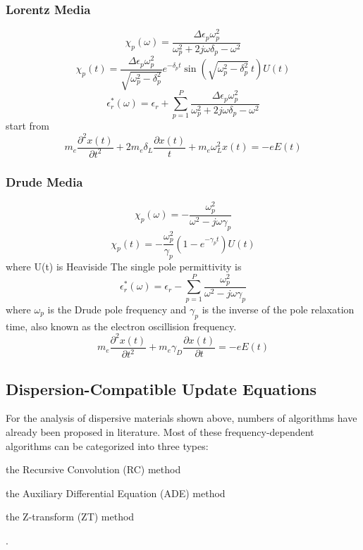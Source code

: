 \subsubsection{Lorentz Media}
\begin{equation}
  \chi_p(\omega) = \frac{\Delta\epsilon_p\omega_p^2}{\omega_p^2 + 2j\omega\delta_p - \omega^2}  
\end{equation}
\begin{equation}
  \chi_p(t) = \frac{\Delta \epsilon_p \omega_p^2}{\sqrt{\omega_p^2 - \delta_p^2}}e^{-\delta_p t}\sin\left(\sqrt{\omega_p^2-\delta_p^2}\ t\right)U(t)
\end{equation}
\begin{equation}
  \epsilon_r^*(\omega) = \epsilon_r + \sum_{p=1}^P \frac{\Delta\epsilon_p\omega_p^2}{\omega_p^2 + 2j\omega\delta_p - \omega^2}  
\end{equation}
start from
\begin{equation}
    m_e\frac{\partial^2 x(t)}{\partial t^2} + 2m_e\delta_L\frac{\partial x(t)}{t} + m_e\omega_L^2x(t) = -eE(t)
\end{equation}



\subsubsection{Drude Media}
\begin{equation}
  \chi_p(\omega) = -\frac{\omega_p^2}{\omega^2 - j\omega\gamma_p}  
\end{equation}
\begin{equation}
  \chi_p(t) = -\frac{\omega_p^2}{\gamma_p}\left(1-e^{-\gamma_p t}\right) U(t)
\end{equation}
where U(t) is Heaviside
The single pole permittivity is 
\begin{equation}
  \epsilon_r^*(\omega) = \epsilon_r - \sum_{p=1}^P \frac{\omega_p^2}{\omega^2-j\omega\gamma_p}
\end{equation}
where $\omega_p$ is the Drude pole frequency and $\gamma_p$ is the inverse of the pole relaxation time, also known as the
electron oscillision frequency.
\begin{equation}
  m_e\frac{\partial^2 x(t)}{\partial t^2} + m_e\gamma_D\frac{\partial x(t)}{\partial t} = -eE(t)
\end{equation}




\subsection{Dispersion-Compatible Update Equations}
For the analysis of dispersive materials shown above, numbers of algorithms have already been proposed in literature.
Most of these frequency-dependent algorithms can be categorized into three types: 
\begin{inparaenum}[(1)]
\item the Recursive Convolution (RC) method
\item the Auxiliary Differential Equation (ADE) method
\item the Z-transform (ZT) method
\end{inparaenum}.

